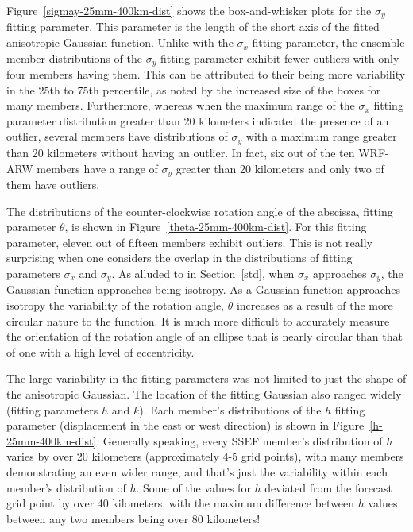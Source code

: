 \mbox{Figure \ref{sigmay-25mm-400km-dist}} shows the box-and-whisker plots for the $\sigma_y$ fitting parameter.
This parameter is the length of the short axis of the fitted anisotropic Gaussian function.
Unlike with the $\sigma_x$ fitting parameter, the ensemble member distributions of the $\sigma_y$ fitting parameter exhibit fewer outliers with only four members having them.
This can be attributed to their being more variability in the 25th to 75th percentile, as noted by the increased size of the boxes for many members.
Furthermore, whereas when the maximum range of the $\sigma_x$ fitting parameter distribution greater than 20 kilometers indicated the presence of an outlier, several members have distributions of $\sigma_y$ with a maximum range greater than 20 kilometers without having an outlier.
In fact, six out of the ten WRF-ARW members have a range of $\sigma_y$ greater than 20 kilometers and only two of them have outliers.


The distributions of the counter-clockwise rotation angle of the abscissa, fitting parameter $\theta$, is shown in \mbox{Figure \ref{theta-25mm-400km-dist}}.
For this fitting parameter, eleven out of fifteen members exhibit outliers.
This is not really surprising when one considers the overlap in the distributions of fitting parameters $\sigma_x$ and $\sigma_y$.
As alluded to in \mbox{Section \ref{std}}, when $\sigma_x$ approaches $\sigma_y$, the Gaussian function approaches being isotropy.
As a Gaussian function approaches isotropy the variability of the rotation angle, $\theta$ increases as a result of the more circular nature to the function.
It is much more difficult to accurately measure the orientation of the rotation angle of an ellipse that is nearly circular than that of one with a high level of eccentricity.


The large variability in the fitting parameters was not limited to just the shape of the anisotropic Gaussian.
The location of the fitting Gaussian also ranged widely (fitting parameters $h$ and $k$).
Each member's distributions of the $h$ fitting parameter (displacement in the east or west direction) is shown in \mbox{Figure \ref{h-25mm-400km-dist}}.
Generally speaking, every SSEF member's distribution of $h$ varies by over 20 kilometers (approximately 4-5 grid points), with many members demonstrating an even wider range, and that's just the variability within each member's distribution of $h$.
Some of the values for $h$ deviated from the forecast grid point by over 40 kilometers, with the maximum difference between $h$ values between any two members being over 80 kilometers!


